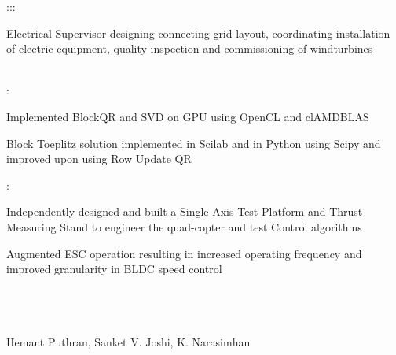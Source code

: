 \documentclass[]{hemant-style}
\begin{document}
\begin{minipage}[]{\textwidth}
\begin{minipage}{\textwidth}
\begin{minipage}[t][][c]{.75\textwidth}
                            :::
                            \begin{hitemize}
                                \item Electrical Supervisor designing connecting grid layout, coordinating installation of electric
                                equipment, quality inspection and commissioning of windturbines
                            \end{hitemize}
                            \vspace{1em}
                             \\
                            :
                            \begin{hitemize}
                                \item Implemented BlockQR and SVD on GPU using OpenCL and clAMDBLAS
                                \item Block Toeplitz solution implemented in Scilab and in Python using Scipy and improved upon using Row Update QR
                            \end{hitemize}
                            :
                            \begin{hitemize}
                                \item Independently designed and built a Single Axis Test Platform and Thrust Measuring Stand to engineer the quad-copter and test Control algorithms
                                \item Augmented ESC operation resulting in increased operating frequency  and improved granularity in BLDC speed control
                            \end{hitemize}
                            \vspace{1em}
                             \\
                            \\
                            \\
                            Hemant Puthran, Sanket V. Joshi, K. Narasimhan
                            \end{minipage}
                \end{minipage}
        \end{minipage}
        
    
\end{document}
